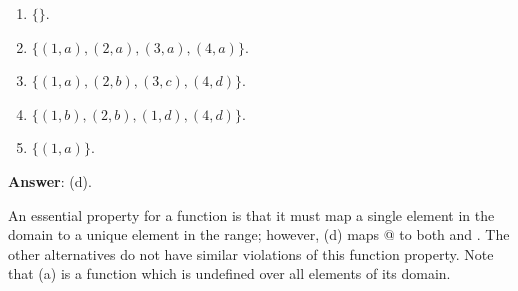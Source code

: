 \documentclass[12pt]{article}
\begin{document}
\begin{enumerate}
\begin{enumerate}
\item $\{\}$.

\item $\{(1, a), (2, a), (3, a), (4, a)\}$.  

\item $\{(1, a), (2, b), (3, c), (4, d)\}$.  

\item $\{(1, b), (2, b), (1, d), (4, d)\}$.  

\item $\{(1, a)\}$.  

  
\end{enumerate}
\textbf{Answer}: (d).

An essential property for a function is that it must map a single
element in the domain to a unique element in the range; however, (d)
maps @ to both \verb@b@ and \verb@d@.  The other alternatives
do not have similar violations of this function property.  Note that
(a) is a function which is undefined over all elements of its domain.

\end{enumerate}
\end{document}
